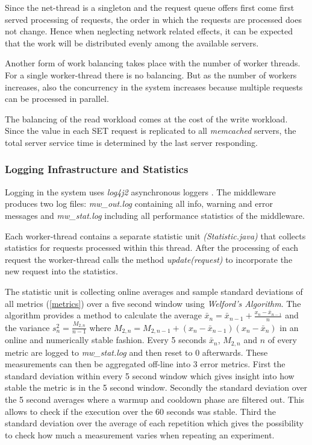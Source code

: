 \documentclass[report.tex]{subfiles}
\begin{document}
Since the net-thread is a singleton and the request queue offers first come first served processing of requests, the order in which the requests are processed does not change. Hence when neglecting network related effects, it can be expected that the work will be distributed evenly among the available servers.

Another form of work balancing takes place with the number of worker threads. For a single worker-thread there is no balancing. But as the number of workers increases, also the concurrency in the system increases because multiple requests can be processed in parallel.

The balancing of the read workload comes at the cost of the write workload. Since the value in each SET request is replicated to all \emph{memcached} servers, the total server service time is determined by the last server responding.


\subsubsection{Logging Infrastructure and Statistics}

Logging in the system uses \emph{log4j2} asynchronous loggers \cite{log4j2}. The middleware produces two log files: \emph{mw\_out.log} containing all info, warning and error messages and \emph{mw\_stat.log} including all performance statistics of the middleware.

Each worker-thread contains a separate statistic unit \emph{(Statistic.java)} that collects statistics for requests processed within this thread.
After the processing of each request the worker-thread calls the method \emph{update(request)} to incorporate the new request into the statistics.  

The statistic unit is collecting online averages and sample standard deviations of all metrics (\ref{metrics}) over a five second window using \emph{Welford's Algorithm}.\cite{Knuth:1997:ACP:270146} 
The algorithm provides a method to calculate the average $\bar{x}_n = \bar{x}_{n-1} + \frac{x_n -\bar{x}_{n-1}}{n}$ and the variance $s^2_n = \frac{M_{2,n}}{n-1}$ where $M_{2,n} = M_{2,n-1} + (x_n - \bar{x}_{n-1})(x_n - \bar{x}_n)$ in an online and numerically stable fashion.
Every 5 seconds $\bar{x}_n$, $M_{2,n}$ and $n$ of every metric are logged to \emph{mw\_stat.log} and then reset to 0 afterwards. These measurements can then be aggregated off-line into 3 error metrics. First the standard deviation within every 5 second window which gives insight into how stable the metric is in the 5 second window. Secondly the standard deviation over the 5 second averages where a warmup and cooldown phase are filtered out. This allows to check if the execution over the 60 seconds was stable. Third the standard deviation over the average of each repetition which gives the possibility to check how much a measurement varies when repeating an experiment.
\end{document}
